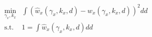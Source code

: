 \begin{equation}
\begin{split}
	\min_{\gamma_x,k_x}& \int \left(\hat{w}_{x}(\gamma_x,k_x,d) - w_{x}(\gamma_x,k_x,d)\right)^2 dd\\
	\text{s.t. }& 1 = \int \hat{w}_{x}(\gamma_x,k_x,d) dd
\end{split}
\label{ch4:equ:trip-distance-minimisation}
\end{equation}